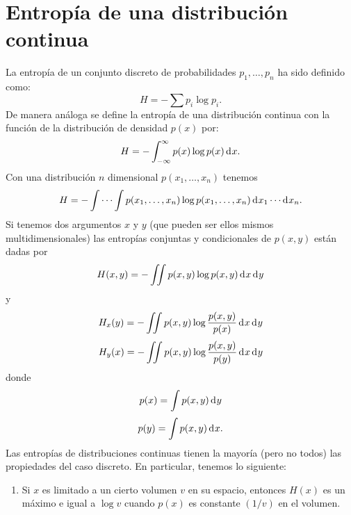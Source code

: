 \section{Entrop\'ia de una distribuci\'on continua}

La entrop\'ia de un conjunto discreto de probabilidades $p_1, \ldots,
p_n$ ha sido definido como:
\begin{equation}
  H = -\sum p_i \log p_i.
\end{equation}
De manera an\'aloga se define la entrop\'ia de una distribuci\'on continua
con la funci\'on de la distribuci\'on de densidad $p(x)$ por:
\begin{equation}
  H = -\int_{-\infty}^{\infty} p(x) \log p(x) \diff x.
\end{equation}
Con una distribuci\'on $n$ dimensional $p(x_1, \ldots, x_n)$ tenemos
\begin{equation}
  H = -\int \cdots \int p(x_1, \ldots, x_n) \log p(x_1, \ldots,
  x_n) \diff x _1 \cdots \diff x _n.
\end{equation}
Si tenemos dos argumentos $x$ y $y$ (que pueden ser ellos mismos
multidimensionales) las entrop\'ias conjuntas y condicionales de $p(x, y)$
est\'an dadas por
\begin{equation}
  H(x, y) = -\iint p(x, y) \log p(x, y) \diff x \diff y 
\end{equation}
y
\begin{equation}
  H_x(y) = -\iint p(x, y) \log \frac{p(x, y)}{p(x)} \diff x \diff y 
\end{equation}
\begin{equation}
  H_y(x) = -\iint p(x, y) \log \frac{p(x, y)}{p(y)} \diff x \diff y 
\end{equation}
donde
\begin{equation}
  p(x) = \int p(x, y) \diff y 
\end{equation}
\begin{equation}
  p(y) = \int p(x, y) \diff x.
\end{equation}
Las entrop\'ias de distribuciones continuas tienen la mayor\'ia (pero
no todos) las propiedades del caso discreto. En particular, tenemos lo
siguiente:
\begin{enumerate}
  \item Si $x$ es limitado a un cierto volumen $v$ en su espacio, entonces
  $H(x)$ es un m\'aximo e igual a $\log v$ cuando $p(x)$ es constante
  $(1/v)$ en el volumen.
\end{enumerate}
